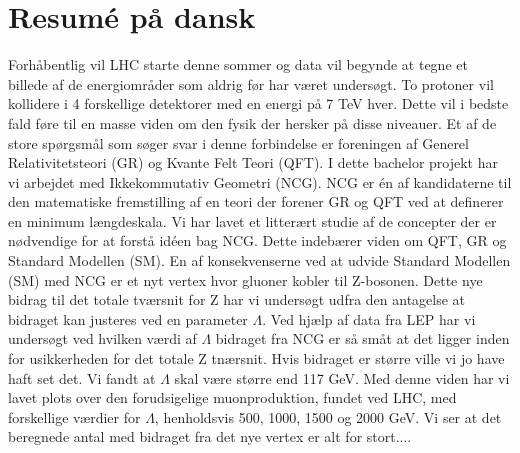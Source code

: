 \section{Resumé på dansk}
Forhåbentlig vil LHC starte denne sommer og data vil begynde at tegne et billede af de energiområder som aldrig før har været undersøgt. To protoner vil kollidere i 4 forskellige detektorer med en energi på 7 TeV hver. Dette vil i bedste fald føre til en masse viden om den fysik der hersker på disse niveauer. Et af de store spørgsmål som søger svar i denne forbindelse er foreningen af Generel Relativitetsteori (GR) og Kvante Felt Teori (QFT). I dette bachelor projekt har vi arbejdet med Ikkekommutativ Geometri (NCG). NCG er én af kandidaterne til den matematiske fremstilling af en teori der forener GR og QFT ved at definerer en minimum længdeskala. Vi har lavet et litterært studie af de concepter der er nødvendige for at forstå idéen bag NCG. Dette indebærer viden om QFT, GR og Standard Modellen (SM). En af konsekvenserne ved at udvide Standard Modellen (SM) med NCG er et nyt vertex hvor gluoner kobler til Z-bosonen. Dette nye bidrag til det totale tværsnit for Z har vi undersøgt udfra den antagelse at bidraget kan justeres ved en parameter $\Lambda$. Ved hjælp af data fra LEP har vi undersøgt ved hvilken værdi af $\Lambda$ bidraget fra NCG er så småt at det ligger inden for usikkerheden for det totale Z tnærsnit. Hvis bidraget er større ville vi jo have haft set det. Vi fandt at $\Lambda$ skal være større end 117 GeV. Med denne viden har vi lavet plots over den forudsigelige muonproduktion, fundet ved LHC, med forskellige værdier for $\Lambda$, henholdsvis 500, 1000, 1500 og 2000 GeV. Vi ser at det beregnede antal med bidraget fra det nye vertex er alt for stort....